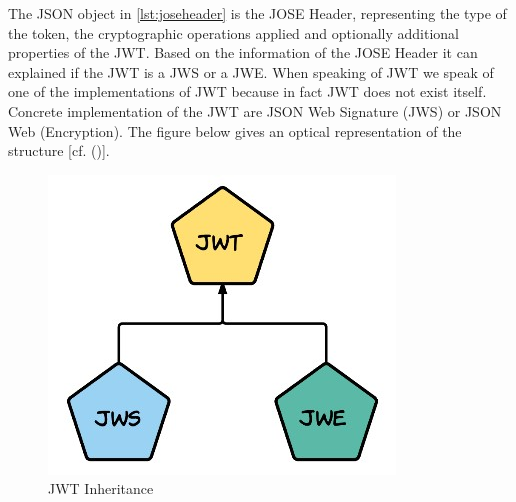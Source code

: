 {The JSON object in \ref{lst:joseheader} is the JOSE Header, representing the type of the token, the cryptographic operations applied and optionally additional properties of the JWT. Based on the information of the JOSE Header it can explained if the JWT is a JWS or a JWE. When speaking of JWT we speak of one of the implementations of JWT because in fact JWT does not exist itself. Concrete implementation of the JWT are JSON Web Signature (JWS) or JSON Web (Encryption). The figure below gives an optical representation of the structure [cf. (\cite{Siriwardena:JWTJWSJWE:2016})].


\begin{figure}[h]
\centering
\includegraphics[width=0.6\linewidth]{images/jwtjwsjwe}
\caption[JWT Inheritence]{JWT Inheritance}
\label{fig:jwtjwsjwe}
\end{figure}

}
